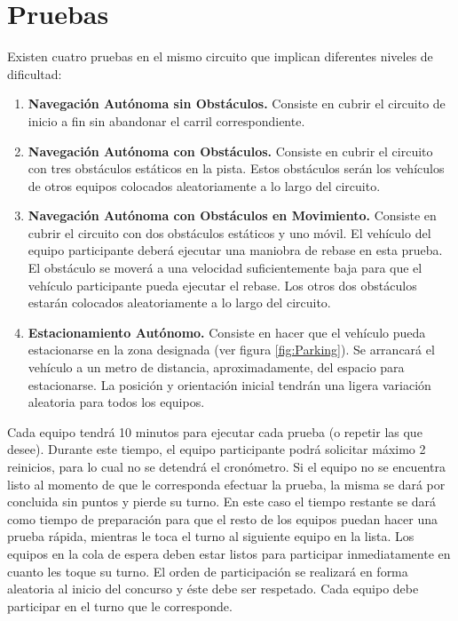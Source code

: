 \documentclass[letterpaper,12pt]{article}
\begin{document}
\section{Pruebas}
Existen cuatro pruebas en el mismo circuito que implican diferentes niveles de dificultad:

\begin{enumerate}
\item \textbf{Navegación Autónoma sin Obstáculos.} Consiste en cubrir el circuito de inicio a fin sin abandonar el carril correspondiente.
\item \textbf{Navegación Autónoma con Obstáculos.} Consiste en cubrir el circuito con tres obstáculos estáticos en la pista. Estos obstáculos serán los vehículos de otros equipos colocados aleatoriamente a lo largo del circuito.
\item \textbf{Navegación Autónoma con Obstáculos en Movimiento.} Consiste en cubrir el circuito con dos obstáculos estáticos y uno móvil. El vehículo del equipo participante deberá ejecutar una maniobra de rebase en esta prueba. El obstáculo se moverá a una velocidad suficientemente baja para que el vehículo participante pueda ejecutar el rebase. Los otros dos obstáculos estarán colocados aleatoriamente a lo largo del circuito.
  \item \textbf{Estacionamiento Autónomo.} Consiste en hacer que el vehículo pueda estacionarse en la zona designada (ver figura \ref{fig:Parking}). Se arrancará el vehículo a un metro de distancia, aproximadamente, del espacio para estacionarse. La posición y orientación inicial tendrán una ligera variación aleatoria para todos los equipos. 
\end{enumerate}

Cada equipo tendrá 10 minutos para ejecutar cada prueba (o repetir las que desee). Durante este tiempo, el equipo participante podrá solicitar máximo 2 reinicios, para lo cual no se detendrá el cronómetro. Si el equipo no se encuentra listo al momento de que le corresponda
efectuar la prueba, la misma se dará por concluida sin puntos y pierde su turno. En este caso el tiempo restante se dará como tiempo de preparación para que el resto de los equipos puedan hacer una prueba rápida, mientras le toca el turno al siguiente equipo en la lista. Los equipos en la cola de espera deben estar listos para participar inmediatamente en cuanto les toque su turno. El orden de participación se realizará en forma aleatoria al inicio del concurso y éste debe ser respetado. Cada equipo debe participar en el turno que le corresponde.
\end{document}
